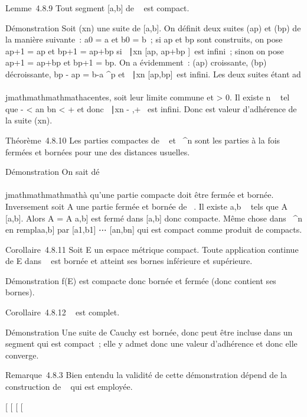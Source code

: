 Lemme~4.8.9 Tout segment {[}a,b{]} de ~ est compact.

Démonstration Soit (xn) une suite de {[}a,b{]}. On définit
deux suites (ap) et (bp) de la manière suivante~:
a0 = a et b0 = b~; si ap et bp
sont construits, on pose ap+1 = ap et bp+1
= ap+bp  si
\n \in {}~∣xn \in
{[}ap, ap+bp 
{]}\ est infini~; sinon on pose ap+1 =
ap+bp  et bp+1 =
bp. On a évidemment~: (ap) croissante,
(bp) décroissante, bp - ap = b-a
^p et \n \in
{}~∣xn \in
{[}ap,bp{]}\ est infini. Les deux
suites étant ad\\\\jmathmathmathmathacentes, soit \ell leur limite commune et \epsilon \textgreater{}
0. Il existe n \in {}~ tel que \ell - \epsilon \textless{} an \leq \ell \leq
bn \textless{} \ell + \epsilon et donc \n \in
{}~∣xn \in{]}\ell - \epsilon,\ell +
\epsilon{[}\ est infini. Donc \ell est valeur d'adhérence de la
suite (xn).

Théorème~4.8.10 Les parties compactes de ~ et ~^n sont les
parties à la fois fermées et bornées pour une des distances usuelles.

Démonstration On sait dé\\\\jmathmathmathmathà qu'une partie compacte doit être fermée et
bornée. Inversement soit A une partie fermée et bornée de ~. Il existe
a,b \in {}~ tels que A \subset~ {[}a,b{]}. Alors A = A \bigcap {[}a,b{]} est fermé dans
{[}a,b{]} donc compacte. Même chose dans ~^n en
rempla\ccant {[}a,b{]} par
{[}a1,b1{]} \times⋯ \times
{[}an,bn{]} qui est compact comme produit de
compacts.

Corollaire~4.8.11 Soit E un espace métrique compact. Toute application
continue de E dans ~ est bornée et atteint ses bornes inférieure et
supérieure.

Démonstration f(E) est compacte donc bornée et fermée (donc contient ses
bornes).

Corollaire~4.8.12 ~ est complet.

Démonstration Une suite de Cauchy est bornée, donc peut être incluse
dans un segment qui est compact~; elle y admet donc une valeur
d'adhérence et donc elle converge.

Remarque~4.8.3 Bien entendu la validité de cette démonstration dépend de
la construction de ~ qui est employée.

{[}
{[}
{[}
{[}
